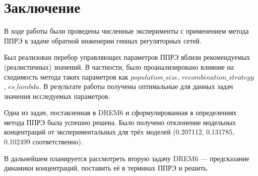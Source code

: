 \chapter*{Заключение}						%

В ходе работы были проведены численные эксперименты с применением метода ППРЭ 
к задаче обратной инженерии генных регуляторных сетей. 

Был реализован перебор 
управляющих параметров ППРЭ вблизи рекомендуемых (реалистичных) значений.
В частности, было проанализировано влияние на сходимость метода таких параметров 
как $population\_size$, $recombination\_strategy$, $es\_lambda$.
В результате работы получены оптимальные для данных задач значения исследуемых 
параметров.

Одна из задач, поставленная в DREM6 и сформулированная в определениях метода 
ППРЭ была успешно решена. Было получено отклонение модельных концентраций 
от экспериментальных для трёх моделей 
(0.207112, 0.131785, 0.102499 соответственно).

В дальнейшем планируется рассмотреть вторую задачу DREM6 — предсказание динамики 
концентраций, поставить её в терминах ППРЭ и решить.

\clearpage

